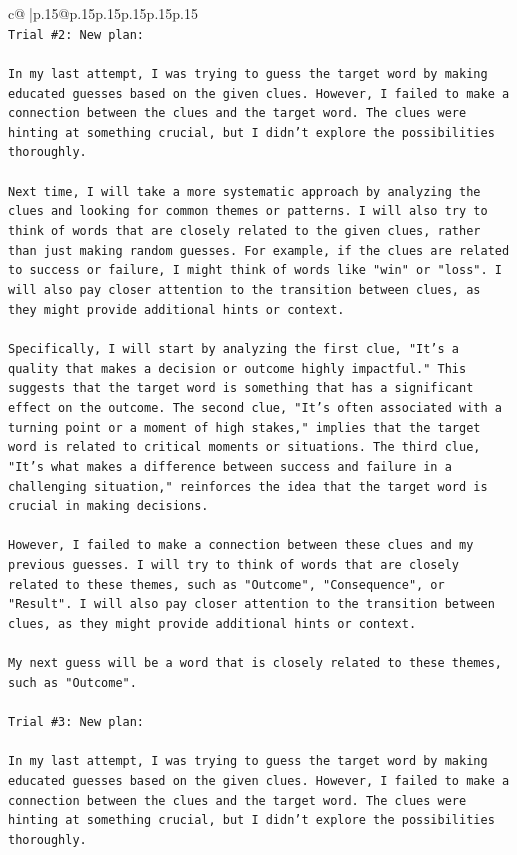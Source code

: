 \documentclass{article}
\begin{document}
{\begin{supertabular}{c@{$\;$}|p{.15\linewidth}@{}p{.15\linewidth}p{.15\linewidth}p{.15\linewidth}p{.15\linewidth}p{.15\linewidth}}
{{{\\ 
\texttt{Trial \#2: New plan: } \\
\\ 
\texttt{In my last attempt, I was trying to guess the target word by making educated guesses based on the given clues. However, I failed to make a connection between the clues and the target word. The clues were hinting at something crucial, but I didn't explore the possibilities thoroughly. } \\
\\ 
\texttt{Next time, I will take a more systematic approach by analyzing the clues and looking for common themes or patterns. I will also try to think of words that are closely related to the given clues, rather than just making random guesses. For example, if the clues are related to success or failure, I might think of words like "win" or "loss". I will also pay closer attention to the transition between clues, as they might provide additional hints or context. } \\
\\ 
\texttt{Specifically, I will start by analyzing the first clue, "It's a quality that makes a decision or outcome highly impactful." This suggests that the target word is something that has a significant effect on the outcome. The second clue, "It's often associated with a turning point or a moment of high stakes," implies that the target word is related to critical moments or situations. The third clue, "It's what makes a difference between success and failure in a challenging situation," reinforces the idea that the target word is crucial in making decisions. } \\
\\ 
\texttt{However, I failed to make a connection between these clues and my previous guesses. I will try to think of words that are closely related to these themes, such as "Outcome", "Consequence", or "Result". I will also pay closer attention to the transition between clues, as they might provide additional hints or context. } \\
\\ 
\texttt{My next guess will be a word that is closely related to these themes, such as "Outcome".} \\
\\ 
\texttt{Trial \#3: New plan: } \\
\\ 
\texttt{In my last attempt, I was trying to guess the target word by making educated guesses based on the given clues. However, I failed to make a connection between the clues and the target word. The clues were hinting at something crucial, but I didn't explore the possibilities thoroughly. } \\
}}}
\end{supertabular}}
\end{document}
